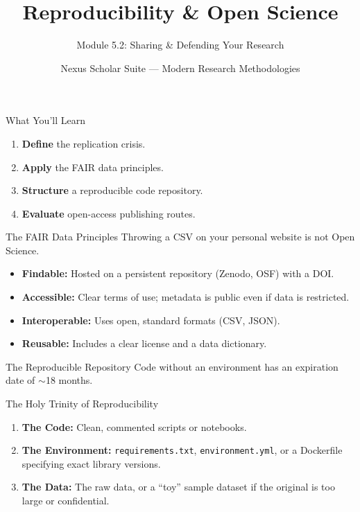\documentclass[aspectratio=169]{beamer}
\title{Reproducibility \& Open Science}
\subtitle{Module 5.2: Sharing \& Defending Your Research}
\author{Nexus Scholar Suite --- Modern Research Methodologies}
\date{}
\begin{document}
\begin{frame}[plain]
  \titlepage
\end{frame}

\begin{frame}{What You'll Learn}
  \begin{enumerate}
    \item \textbf{Define} the replication crisis.
    \item \textbf{Apply} the FAIR data principles.
    \item \textbf{Structure} a reproducible code repository.
    \item \textbf{Evaluate} open-access publishing routes.
  \end{enumerate}
\end{frame}

\begin{frame}{The FAIR Data Principles}
  Throwing a CSV on your personal website is not Open Science.
  \vspace{0.3cm}
  \begin{itemize}
    \item \textbf{Findable:} Hosted on a persistent repository (Zenodo, OSF) with a DOI.
    \item \textbf{Accessible:} Clear terms of use; metadata is public even if data is restricted.
    \item \textbf{Interoperable:} Uses open, standard formats (CSV, JSON).
    \item \textbf{Reusable:} Includes a clear license and a data dictionary.
  \end{itemize}
\end{frame}

\begin{frame}{The Reproducible Repository}
  Code without an environment has an expiration date of $\sim$18 months.
  \vspace{0.3cm}
  \begin{exampleblock}{The Holy Trinity of Reproducibility}
    \begin{enumerate}
      \item \textbf{The Code:} Clean, commented scripts or notebooks.
      \item \textbf{The Environment:} \texttt{requirements.txt}, \texttt{environment.yml}, or a Dockerfile specifying exact library versions.
      \item \textbf{The Data:} The raw data, or a ``toy'' sample dataset if the original is too large or confidential.
    \end{enumerate}
  \end{exampleblock}
\end{frame}
\end{document}
